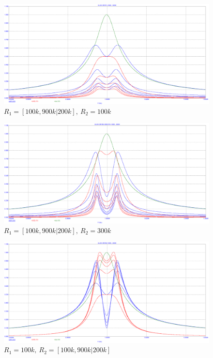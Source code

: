 \documentclass[a4paper, 14pt]{article}%
\begin{document}
\begin{enumerate}
\begin{figure}[h!]
\includegraphics[scale = 0.4]{images/plot2_1.png}
\caption{$R_1 = [100k, 900k|200k], \: R_2 = 100k$}
\label{fig:Image1}
\end{figure}

\begin{figure}[h!]
\centering
\includegraphics[scale = 0.4]{images/plot2_2.png}
\caption{$R_1 = [100k, 900k|200k], \: R_2 = 300k$}
\label{fig:Image1}
\end{figure}

\newpage

\begin{figure}[h!]
\centering
\includegraphics[scale = 0.4]{images/plot2_3.png}
\caption{$R_1 = 100k, \: R_2 = [100k, 900k|200k]$}
\label{fig:Image1}
\end{figure}


\end{enumerate}
\end{document}
